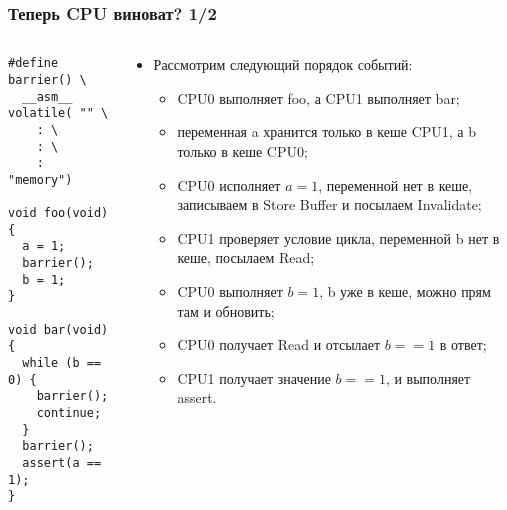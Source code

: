 \begin{frame}[fragile]
\frametitle{Теперь CPU виноват? 1/2}
\begin{columns}
  \begin{column}{0.3\linewidth}
    \begin{lstlisting}
#define barrier() \
  __asm__ volatile( "" \
	: \
	: \
	: "memory")

void foo(void)
{
  a = 1;
  barrier();
  b = 1;
}

void bar(void)
{
  while (b == 0) {
    barrier();
    continue;
  }
  barrier();
  assert(a == 1);
}
    \end{lstlisting}
  \end{column}
  \begin{column}{0.8\linewidth}
  \begin{itemize}
    \item Рассмотрим следующий порядок событий:
    \begin{itemize}
      \item CPU0 выполняет foo, а CPU1 выполняет bar;
      \item переменная a хранится только в кеше CPU1, а b только в кеше CPU0;
      \item CPU0 исполняет $a = 1$, переменной нет в кеше, записываем в Store
      Buffer и посылаем Invalidate;
      \item CPU1 проверяет условие цикла, переменной b нет в кеше, посылаем
      Read;
      \item CPU0 выполняет $b = 1$, b уже в кеше, можно прям там и обновить;
      \item CPU0 получает Read и отсылает $b == 1$ в ответ;
      \item CPU1 получает значение $b == 1$, и выполняет assert.
    \end{itemize}
  \end{itemize}
  \end{column}
\end{columns}
\end{frame}


